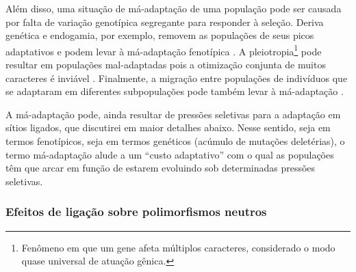 \begin{refsection}
Além disso, uma situação de má-adaptação de uma população pode ser causada por falta de variação genotípica segregante para responder à seleção. Deriva genética e endogamia, por exemplo, removem as populações de seus picos adaptativos e podem levar à má-adaptação fenotípica \parencite{Crespi2000}. A pleiotropia\footnote{Fenômeno em que um gene afeta múltiplos caracteres, considerado o modo quase universal de atuação gênica.} pode resultar em populações mal-adaptadas pois  a otimização conjunta de muitos caracteres é inviável \parencite{Charlesworth2010,Crespi2000}. Finalmente, a migração entre populações de indivíduos que se adaptaram em diferentes subpopulações pode também levar à má-adaptação \parencite{Charlesworth2010,Crespi2000}. %
%

 

A má-adaptação pode, ainda resultar de pressões seletivas para a adaptação em sítios ligados, que discutirei em maior detalhes abaixo. Nesse sentido, seja em termos fenotípicos, seja em termos genéticos (acúmulo de mutações deletérias), o termo má-adaptação alude a um “custo adaptativo” com o qual as populações têm que arcar em função de estarem evoluindo sob determinadas pressões seletivas.


\subsubsection{Efeitos de ligação sobre polimorfismos neutros}


\end{refsection}
